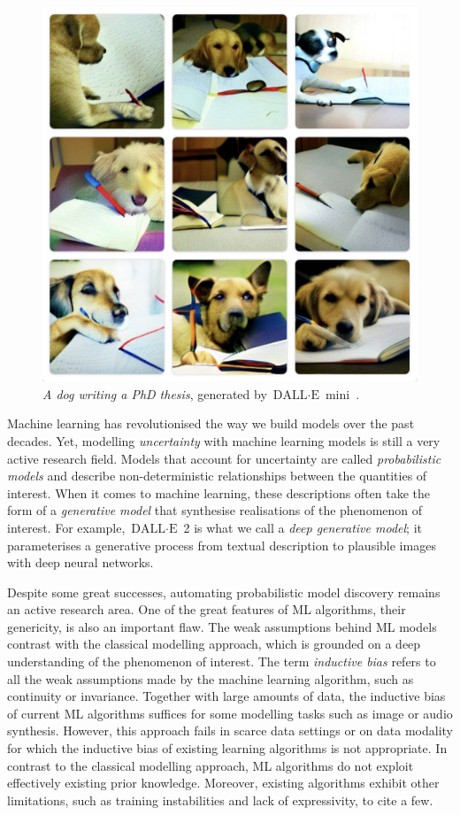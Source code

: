 \begin{figure}
  \centering
  \includegraphics[width=.7\textwidth]{figures/chapter01/dog_phd_thesis.jpeg}
  \caption{\textit{A dog writing a PhD thesis}, generated by $\text{DALL}\cdot\text{E}$ mini~\citep{Dayma_DALL_E_Mini_2021}.}
  \label{fig:dalle-mini}
\end{figure}

Machine learning has revolutionised the way we build models over the past decades. Yet, modelling \textit{uncertainty} with machine learning models is still a very active research field. Models that account for uncertainty are called \textit{probabilistic models} and describe non-deterministic relationships between the quantities of interest. When it comes to machine learning, these descriptions often take the form of a \textit{generative model} that synthesise realisations of the phenomenon of interest. For example, $\text{DALL}\cdot\text{E}$ 2 is what we call a \textit{deep generative model}; it parameterises a generative process from textual description to plausible images with deep neural networks.

Despite some great successes, automating probabilistic model discovery remains an active research area. One of the great features of ML algorithms, their genericity, is also an important flaw. The weak assumptions behind ML models contrast with the classical modelling approach, which is grounded on a deep understanding of the phenomenon of interest. The term \textit{inductive bias} refers to all the weak assumptions made by the machine learning algorithm, such as continuity or invariance. Together with large amounts of data, the inductive bias of current ML algorithms suffices for some modelling tasks such as image or audio synthesis. However, this approach fails in scarce data settings or on data modality for which the inductive bias of existing learning algorithms is not appropriate. In contrast to the classical modelling approach, ML algorithms do not exploit effectively existing prior knowledge. Moreover, existing algorithms exhibit other limitations, such as training instabilities and lack of expressivity, to cite a few.


